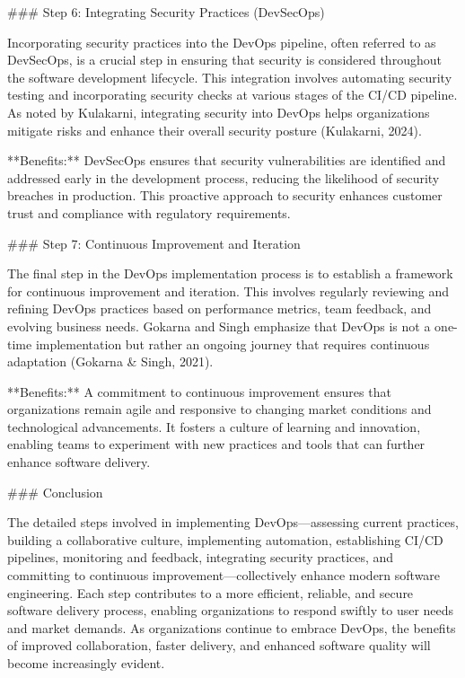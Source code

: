 ### Step 6: Integrating Security Practices (DevSecOps)

Incorporating security practices into the DevOps pipeline, often referred to as DevSecOps, is a crucial step in ensuring that security is considered throughout the software development lifecycle. This integration involves automating security testing and incorporating security checks at various stages of the CI/CD pipeline. As noted by Kulakarni, integrating security into DevOps helps organizations mitigate risks and enhance their overall security posture (Kulakarni, 2024).

**Benefits:** DevSecOps ensures that security vulnerabilities are identified and addressed early in the development process, reducing the likelihood of security breaches in production. This proactive approach to security enhances customer trust and compliance with regulatory requirements.

### Step 7: Continuous Improvement and Iteration

The final step in the DevOps implementation process is to establish a framework for continuous improvement and iteration. This involves regularly reviewing and refining DevOps practices based on performance metrics, team feedback, and evolving business needs. Gokarna and Singh emphasize that DevOps is not a one-time implementation but rather an ongoing journey that requires continuous adaptation (Gokarna & Singh, 2021).

**Benefits:** A commitment to continuous improvement ensures that organizations remain agile and responsive to changing market conditions and technological advancements. It fosters a culture of learning and innovation, enabling teams to experiment with new practices and tools that can further enhance software delivery.

### Conclusion

The detailed steps involved in implementing DevOps—assessing current practices, building a collaborative culture, implementing automation, establishing CI/CD pipelines, monitoring and feedback, integrating security practices, and committing to continuous improvement—collectively enhance modern software engineering. Each step contributes to a more efficient, reliable, and secure software delivery process, enabling organizations to respond swiftly to user needs and market demands. As organizations continue to embrace DevOps, the benefits of improved collaboration, faster delivery, and enhanced software quality will become increasingly evident.

